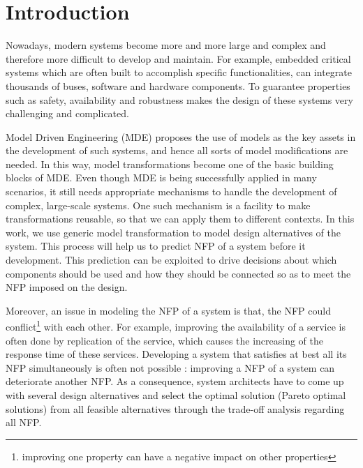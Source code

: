 \documentclass[conference]{IEEEtran}
\begin{document}




\IEEEpeerreviewmaketitle

\section{Introduction}
Nowadays, modern systems become more and more large and complex and therefore more difficult to develop and maintain. For example, embedded critical systems which are often built to accomplish specific functionalities, can integrate thousands of buses, software and hardware components. To guarantee properties such as safety, availability and robustness makes the design of these systems very challenging and complicated.

Model Driven Engineering (MDE) proposes the use of models as the key assets in the development of such systems, and hence all sorts of model modifications are needed. In this way, model transformations become one of the basic building blocks of MDE. Even though MDE is being successfully applied in many scenarios, it still needs appropriate mechanisms to handle the development of complex, large-scale systems. One such mechanism is a facility to make transformations reusable, so that we can apply them to different contexts. In this work, we use generic model transformation to model design alternatives of the system. This process will help us to predict NFP of a system before it development\cite{1291833}. This prediction can be exploited to drive decisions about which components should be used and how they should be connected so as to meet the NFP imposed on the design.

Moreover, an issue in modeling the NFP of a system is that, the NFP could conflict\footnote{improving one property can have a negative impact on other properties} with each other. For example, improving the availability of a service is often done by replication of the service, which causes the increasing of the response time of these services\cite{Yu:2001:CLA:502059.502038}. Developing a system that satisfies at best all its NFP simultaneously is often not possible : improving a NFP of a system can deteriorate another NFP. As a consequence, system architects have to come up with several design alternatives and select the optimal solution (Pareto optimal solutions) from all feasible alternatives through the trade-off analysis regarding all NFP\cite{Coello98acomprehensive}.
\end{document}
